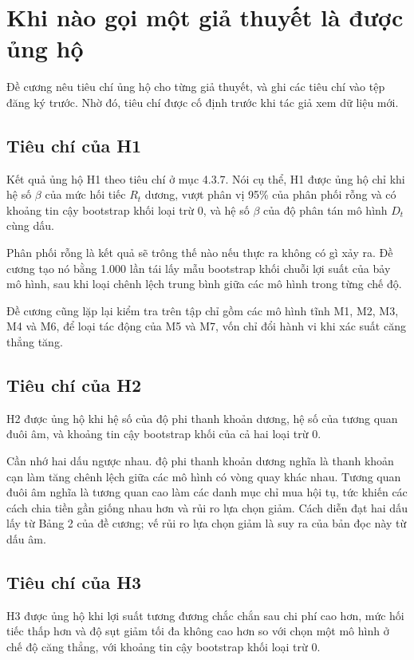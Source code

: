 \section{Khi nào gọi một giả thuyết là được ủng hộ}

Đề cương nêu tiêu chí ủng hộ cho từng giả thuyết, và ghi các tiêu chí vào tệp đăng ký trước. Nhờ đó, tiêu chí được cố định trước khi tác giả xem dữ liệu mới.

\subsection{Tiêu chí của H1}

Kết quả ủng hộ H1 theo tiêu chí ở mục 4.3.7. Nói cụ thể, H1 được ủng hộ chỉ khi hệ số \(\beta\) của mức hối tiếc \(R_{t}\) dương, vượt phân vị 95\% của phân phối rỗng và có khoảng tin cậy bootstrap khối loại trừ 0, và hệ số \(\beta\) của độ phân tán mô hình \(D_{t}\) cùng dấu.

Phân phối rỗng là kết quả sẽ trông thế nào nếu thực ra không có gì xảy ra. Đề cương tạo nó bằng 1.000 lần tái lấy mẫu bootstrap khối chuỗi lợi suất của bảy mô hình, sau khi loại chênh lệch trung bình giữa các mô hình trong từng chế độ.

Đề cương cũng lặp lại kiểm tra trên tập chỉ gồm các mô hình tĩnh M1, M2, M3, M4 và M6, để loại tác động của M5 và M7, vốn chỉ đổi hành vi khi xác suất căng thẳng tăng.

\subsection{Tiêu chí của H2}

H2 được ủng hộ khi hệ số của độ phi thanh khoản dương, hệ số của tương quan đuôi âm, và khoảng tin cậy bootstrap khối của cả hai loại trừ 0.

Cần nhớ hai dấu ngược nhau. độ phi thanh khoản dương nghĩa là thanh khoản cạn làm tăng chênh lệch giữa các mô hình có vòng quay khác nhau. Tương quan đuôi âm nghĩa là tương quan cao làm các danh mục chỉ mua hội tụ, tức khiến các cách chia tiền gần giống nhau hơn và rủi ro lựa chọn giảm. Cách diễn đạt hai dấu lấy từ Bảng 2 của đề cương; vế rủi ro lựa chọn giảm là suy ra của bản đọc này từ dấu âm.

\subsection{Tiêu chí của H3}

H3 được ủng hộ khi lợi suất tương đương chắc chắn sau chi phí cao hơn, mức hối tiếc thấp hơn và độ sụt giảm tối đa không cao hơn so với chọn một mô hình ở chế độ căng thẳng, với khoảng tin cậy bootstrap khối loại trừ 0.

